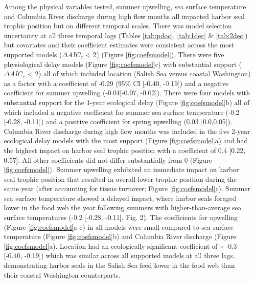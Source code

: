 \documentclass [11pt, proquest] {uwthesis}[2015/03/03]
\begin{document}
Among the physical variables tested, summer upwelling, sea surface
temperature and Columbia River discharge during high flow months all
impacted harbor seal trophic position but on different temporal scales.
There was model selection uncertainty at all three temporal lags (Tables
\ref{tab:pdoc}, \ref{tab:1dec} \& \ref{tab:2dec}) but covariates and
their coefficient estimates were consistent across the most supported
models (\(\Delta AIC_c\) \textless{} 2) (Figure \ref{fig:coefsmodel}).
There were five physiological delay models (Figure
\ref{fig:coefsmodel}c) with substantial support (\(\Delta AIC_c\)
\textless{} 2) all of which included location (Salish Sea versus coastal
Washington) as a factor with a coefficient of -0.29 (95\% CI {[}-0.40,
-0.19{]}) and a negative coefficient for summer upwelling
(-0.04{[}-0.07, -0.02{]}). There were four models with substantial
support for the 1-year ecological delay (Figure \ref{fig:coefsmodel}b)
all of which included a negative coefficient for summer sea surface
temperature (-0.2 {[}-0.28, -0.11{]}) and a positive coefficient for
spring upwelling (0.03 {[}0.0,0.05{]}). Columbia River discharge during
high flow months was included in the five 2-year ecological delay models
with the most support (Figure \ref{fig:coefsmodel}a) and had the highest
impact on harbor seal trophic position with a coefficient of 0.4
{[}0.22, 0.57{]}. All other coefficients did not differ substantially
from 0 (Figure \ref{fig:coefsmodel}). Summer upwelling exhibited an
immediate impact on harbor seal trophic position that resulted in
overall lower trophic position during the same year (after accounting
for tissue turnover; Figure \ref{fig:coefsmodel}c). Summer sea surface
temperature showed a delayed impact, where harbor seals foraged lower in
the food web the year following summers with higher-than-average sea
surface temperatures (-0.2 {[}-0.28, -0.11{]}, Fig. 2). The coefficients
for upwelling (Figure \ref{fig:coefsmodel}a-c) in all models were small
compared to sea surface temperature (Figure \ref{fig:coefsmodel}b) and
Columbia River discharge (Figure \ref{fig:coefsmodel}a). Location had an
ecologically significant coefficient of \textasciitilde{} -0.3 {[}-0.40,
-0.19{]}) which was similar across all supported models at all three
lags, demonstrating harbor seals in the Salish Sea feed lower in the
food web than their coastal Washington counterparts.
\end{document}
